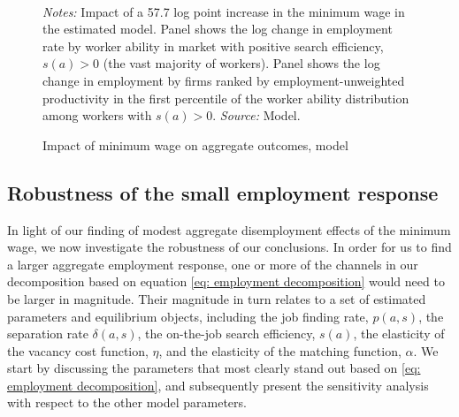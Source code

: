 \begin{figure}[!htb]
  \centering
  \caption{Impact of minimum wage on aggregate outcomes, model\label{figure: impact of minimum wage on aggregates}}
  \prefigvspace
  \\
  \postfigvspace
  \begin{minipage}[t]{1\columnwidth}%
    \begin{spacing}{0.75}
      {\scriptsize \textit{Notes:} Impact of a 57.7 log point increase in the minimum wage in the estimated model. Panel  shows the log change in employment rate by worker ability in market with positive search efficiency, $s(a)>0$ (the vast majority of workers). Panel  shows the log change in employment by firms ranked by employment-unweighted productivity in the first percentile of the worker ability distribution among workers with $s(a)>0$. %
      \textit{Source:} Model.}
    \end{spacing}
  \end{minipage}
\end{figure}




\clearpage
\subsection{Robustness of the small employment response\label{app_subsec:emp_effects_dependence_on_parameters}}

In light of our finding of modest aggregate disemployment effects of the minimum wage, we now investigate the robustness of our conclusions. In order for us to find a larger aggregate employment response, one or more of the channels in our decomposition based on equation \eqref{eq: employment decomposition} would need to be larger in magnitude. Their magnitude in turn relates to a set of estimated parameters and equilibrium objects, including the job finding rate, $p(a,s)$, the separation rate $\delta(a,s)$, the on-the-job search efficiency, $s(a)$, the elasticity of the vacancy cost function, $\eta$, and the elasticity of the matching function, $\alpha$. We start by discussing the parameters that most clearly stand out based on \eqref{eq: employment decomposition}, and subsequently present the sensitivity analysis with respect to the other model parameters.


